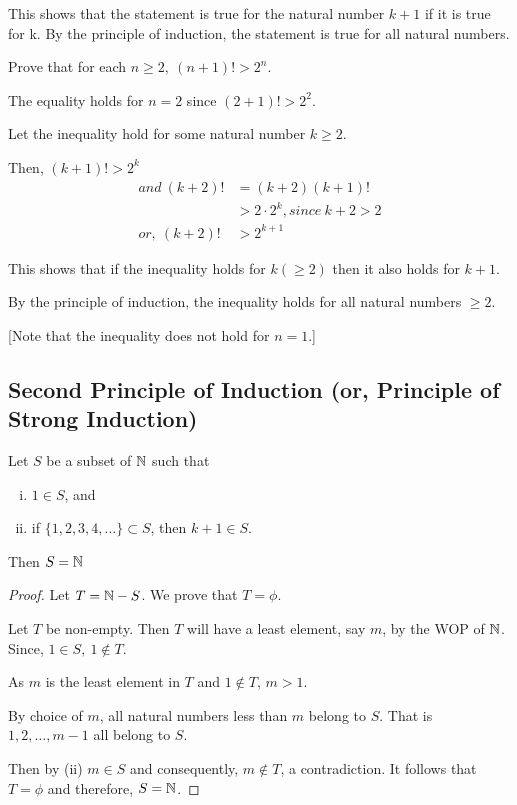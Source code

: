 \documentclass[11pt]{scrartcl}
\begin{document}
	This shows that the statement is true for the natural number $k+1$ if it is true for k. By the principle of induction, the statement is true for all natural numbers.
	
	\begin{example}
		Prove that for each $n \geq 2,\ (n+1)! > 2^{n}$.
	\end{example}

	The equality holds for $n=2$ since $(2+1)! > 2^{2}$.
	
	Let the inequality hold for some natural number $k \geq 2$.
	
	Then, $(k+1)! > 2^{k}$
	\begin{align*}
		and\ (k+2)! &= (k+2)(k+1)!\\
		&> 2 \cdot 2^{k}, since\ k+2>2\\
		or,\ (k+2)! &> 2^{k+1}
	\end{align*}

	This shows that if the inequality holds for $k(\geq 2)$ then it also holds for $k+1$.
	
	By the principle of induction, the inequality holds for all natural numbers $\geq 2$.
	
	[Note that the inequality does not hold for $n=1$.]
	
	\subsection{Second Principle of Induction (or, Principle of Strong Induction)}
	\begin{definition}
		Let $S$ be a subset of $\mathbb N$ such that
		\begin{enumerate}[(i)]
			\item $1 \in S$, and
			\item if $\{1,2,3,4,\dots\} \subset S$, then $k+1 \in S$.
		\end{enumerate}
		Then $S = \mathbb N$
	\end{definition}

	\begin{proof}
		Let $T = \mathbb N - S$. We prove that $T = \phi$.
		
		Let $T$ be non-empty. Then $T$ will have a least element, say $m$, by the WOP of $\mathbb N$. Since, $1 \in S,\ 1 \notin T$.
		
		As $m$ is the least element in $T$ and $1 \notin T$, $m>1$.
		
		By choice of $m$, all natural numbers less than $m$ belong to $S$. That is $1,2,\dots, m-1$ all belong to $S$.
		
		Then by (ii) $m \in S$ and consequently, $m \notin T$, a contradiction. It follows that $T = \phi$ and therefore, $S=\mathbb N$.
	\end{proof}
\end{document}
